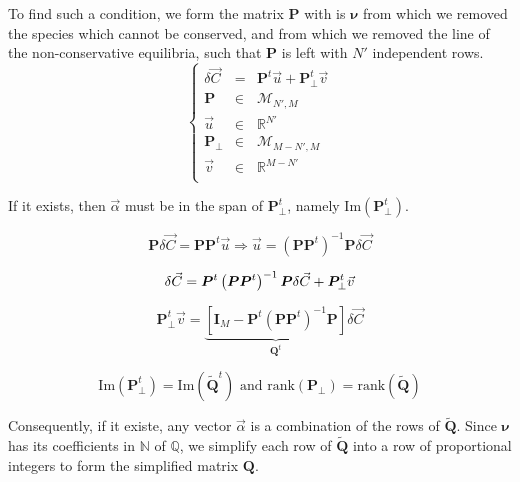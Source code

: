\documentclass[aps,12pt]{revtex4}
\begin{document}
To find such a condition, we form the matrix $\bm{P}$ with is $\bm{\nu}$ from which we removed the species
which cannot be conserved, and from which we removed the line of the non-conservative equilibria, 
such that $\bm{P}$ is left with $N'$ independent rows.
\begin{equation}
\left \lbrace
\begin{array}{rcl}
\delta\vec{C} & = & \bm{P}^t\vec{u} + \bm{P}_\perp^t \vec{v} \\
\bm{P}       & \in & \mathcal{M}_{N',M}\\
\vec{u}      & \in & \mathbb{R}^{N'}\\
\bm{P}_\perp & \in & \mathcal{M}_{M-N',M}\\
\vec{v}      & \in & \mathbb{R}^{M-N'}     \\
\end{array}
\right .
\end{equation}

If it exists, then $\vec{\alpha}$ must be in the span of $\bm{P}_\perp^t$, namely $\mathrm{Im}\left(\bm{P}_\perp^t\right)$.

\begin{equation}
	\bm{P} \delta \vec{C} = \bm{P}\bm{P}^t\vec{u}
	 \Rightarrow \vec{u} = \left(\bm{P}\bm{P}^t\right)^{-1} \bm{P} \delta \vec{C}
\end{equation}

\begin{equation}
	\delta\vec{C} =  \bm{P}^t\left(\bm{P}\bm{P}^t\right)^{-1} \bm{P} \delta \vec{C} + \bm{P}_\perp^t \vec{v}\\
\end{equation}
	
\begin{equation}
	\bm{P}_\perp^t \vec{v} = 
	\underbrace{\left\lbrack \bm{I}_M - \bm{P}^t\left(\bm{P}\bm{P}^t\right)^{-1} \bm{P} \right\rbrack}_{\bm{Q}^t} \delta\vec{C}
\end{equation}

\begin{equation}
	\mathrm{Im}\left(\bm{P}_\perp^t\right) = \mathrm{Im}\left(\bm{\tilde Q}^t\right) \text{ and }
	\mathrm{rank}(\bm{P}_\perp) = \mathrm{rank}(\bm{\tilde Q})
\end{equation}

Consequently, if it existe, any vector $\vec{\alpha}$ is a combination of the rows of $\bm{\tilde Q}$.
Since $\bm{\nu}$ has its coefficients in $\mathbb{N}$ of $\mathbb{Q}$, we simplify each row of 
$\bm{\tilde Q}$ into a row of proportional integers to form the simplified matrix $\bm{Q}$.
\end{document}

